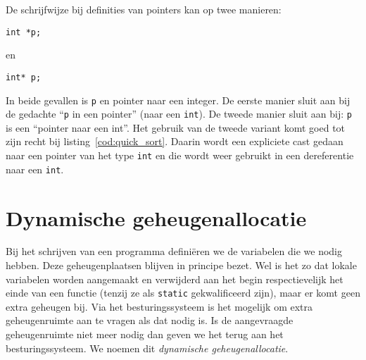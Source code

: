 

\begin{infobox}
De schrijfwijze bij definities van pointers kan op twee manieren:

\hspace*{1em}\texttt{int *p;}

en

\hspace*{1em}\texttt{int* p;}

In beide gevallen is \texttt{p} en pointer naar een integer. De eerste manier sluit aan bij de gedachte ``\texttt{p} in een pointer'' (naar een \texttt{int}). De tweede manier sluit aan bij: \texttt{p} is een ``pointer naar een int''. Het gebruik van de tweede variant komt goed tot zijn recht bij listing~\ref{cod:quick_sort}. Daarin wordt een expliciete cast gedaan naar een pointer van het type \texttt{int} en die wordt weer gebruikt in een dereferentie naar een \texttt{int}.
\end{infobox}

%
%
%
%
%
%
%
%




\section{Dynamische geheugenallocatie}
\label{sec:dynamischegeheugenallocatie}
Bij het schrijven van een programma definiëren we de variabelen die we nodig hebben. Deze geheugenplaatsen blijven in principe bezet. Wel is het zo dat lokale variabelen worden aangemaakt en verwijderd aan het begin respectievelijk het einde van een functie (tenzij ze als \texttt{static} gekwalificeerd zijn), maar er komt geen extra geheugen bij. Via het besturingssysteem is het mogelijk om extra geheugenruimte aan te vragen als dat nodig is. Is de aangevraagde geheugenruimte niet meer nodig dan geven we het terug aan het besturingssysteem. We noemen dit \textsl{dynamische geheugenallocatie}.

